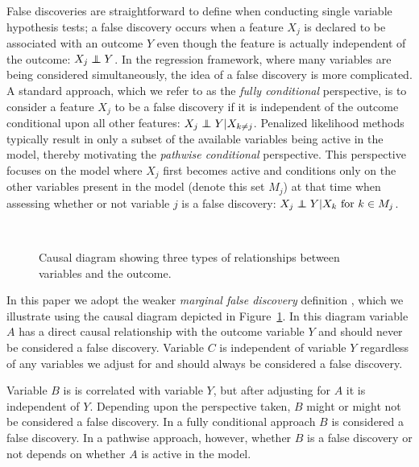 False discoveries are straightforward to define when conducting single variable hypothesis tests; a false discovery occurs when a feature $X_j$ is declared to be associated with an outcome $Y$ even though the feature is actually independent of the outcome: $X_j \independent Y$. In the regression framework, where many variables are being considered simultaneously, the idea of a false discovery is more complicated. A standard approach, which we refer to as the \textit{fully conditional} perspective, is to consider a feature $X_j$ to be a false discovery if it is independent of the outcome conditional upon all other features: $X_j \independent Y | X_{k \neq j}$. Penalized likelihood methods typically result in only a subset of the available variables being active in the model, thereby motivating the \textit{pathwise conditional} perspective.  This perspective focuses on the model where $X_j$ first becomes active and conditions only on the other variables present in the model (denote this set $M_j$) at that time when assessing whether or not variable $j$ is a false discovery: $X_j \independent Y | X_k \text{ for } k \in M_j$.

\begin{figure}[!htb]
\centering
{} \\
\caption{\label{Fig:diagram} Causal diagram showing three types of relationships between variables and the outcome.}
\end{figure}

In this paper we adopt the weaker \textit{marginal false discovery} definition \citep{Breheny2017}, which we illustrate using the causal diagram depicted in Figure~\ref{Fig:diagram}. In this diagram variable $A$ has a direct causal relationship with the outcome variable $Y$ and should never be considered a false discovery. Variable $C$ is independent of variable $Y$ regardless of any variables we adjust for and should always be considered a false discovery. 

Variable $B$ is is correlated with variable $Y$, but after adjusting for $A$ it is independent of $Y$. Depending upon the perspective taken, $B$ might or might not be considered a false discovery. In a fully conditional approach $B$ is considered a false discovery.  In a pathwise approach, however, whether $B$ is a false discovery or not depends on whether $A$ is active in the model.

